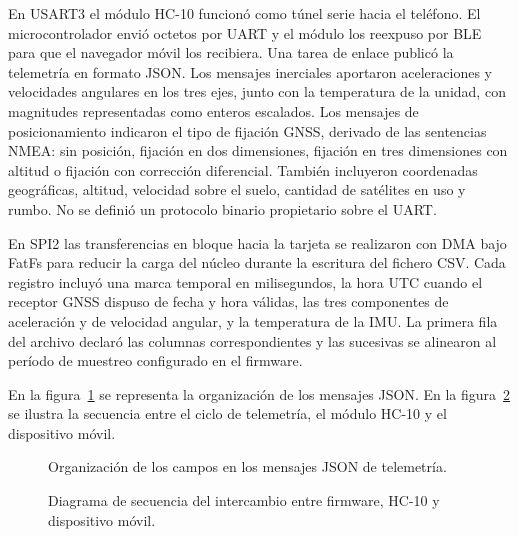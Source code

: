 En USART3 el módulo HC-10 funcionó como túnel serie hacia el teléfono. El microcontrolador envió octetos por UART y el módulo los reexpuso por BLE para que el navegador móvil los recibiera. Una tarea de enlace publicó la telemetría en formato JSON. Los mensajes inerciales aportaron aceleraciones y velocidades angulares en los tres ejes, junto con la temperatura de la unidad, con magnitudes representadas como enteros escalados. Los mensajes de posicionamiento indicaron el tipo de fijación GNSS, derivado de las sentencias NMEA: sin posición, fijación en dos dimensiones, fijación en tres dimensiones con altitud o fijación con corrección diferencial. También incluyeron coordenadas geográficas, altitud, velocidad sobre el suelo, cantidad de satélites en uso y rumbo. No se definió un protocolo binario propietario sobre el UART.

En SPI2 las transferencias en bloque hacia la tarjeta se realizaron con DMA bajo FatFs para reducir la carga del núcleo durante la escritura del fichero CSV. Cada registro incluyó una marca temporal en milisegundos, la hora UTC cuando el receptor GNSS dispuso de fecha y hora válidas, las tres componentes de aceleración y de velocidad angular, y la temperatura de la IMU. La primera fila del archivo declaró las columnas correspondientes y las sucesivas se alinearon al período de muestreo configurado en el firmware.

En la figura~\ref{fig:cap3-formato-mensaje} se representa la organización de los mensajes JSON. En la figura~\ref{fig:cap3-secuencia-comunicacion} se ilustra la secuencia entre el ciclo de telemetría, el módulo HC-10 y el dispositivo móvil.

\begin{figure}[H]
	\centering
	\caption[Organización del mensaje]{Organización de los campos en los mensajes JSON de telemetría.}
	\label{fig:cap3-formato-mensaje}
\end{figure}

\begin{figure}[H]
	\centering
	\caption[Secuencia de comunicación]{Diagrama de secuencia del intercambio entre firmware, HC-10 y dispositivo móvil.}
	\label{fig:cap3-secuencia-comunicacion}
\end{figure}

